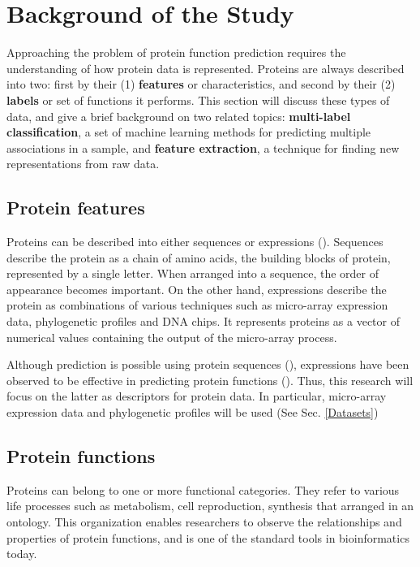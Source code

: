 \section{Background of the Study}
\label{Background}

Approaching the problem of protein function prediction requires the
understanding of how protein data is represented. Proteins are always
described into two: first by their (1) \textbf{features} or characteristics,
and second by their (2) \textbf{labels} or set of functions it performs. This
section will discuss these types of data, and give a brief background on two
related topics: \textbf{multi-label classification}, a set of machine learning
methods for predicting multiple associations in a sample, and \textbf{feature 
extraction}, a technique for finding new representations from raw data.

\subsection{Protein features}

\par Proteins can be described into either sequences or expressions 
(\cite{xiong2006essential}). Sequences describe the protein as a chain
of amino acids, the building blocks of protein, represented by a single letter.
When arranged into a sequence, the order of appearance becomes important.
On the other hand, expressions describe the protein as combinations of various
techniques such as micro-array expression data, phylogenetic profiles and DNA
chips. It represents proteins as a vector of numerical values containing the
output of the micro-array process.

\par Although prediction is possible using protein sequences
(\cite{whisstock2003prediction, devos2000practical}), expressions have
been observed to be effective in predicting protein functions
(\cite{eisenberg2000protein, marcotte1999combined}). Thus, this
research will focus on the latter as descriptors for protein data. In
particular, micro-array expression data and phylogenetic profiles will
be used (See Sec. \ref{Datasets})

\subsection{Protein functions}

\par Proteins can belong to one or more functional categories. They
refer to various life processes such as metabolism, cell
reproduction, synthesis that arranged in an ontology. This
organization enables researchers to observe the relationships and 
properties of protein functions, and is one of the standard tools
in bioinformatics today.

